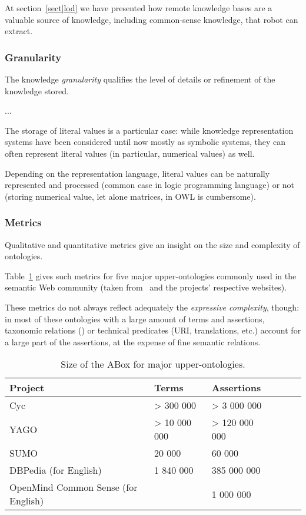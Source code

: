 At section~\ref{sect|lod} we have presented how remote knowledge bases are a
valuable source of knowledge, including common-sense knowledge, that robot can
extract.

\subsubsection{Granularity}

The knowledge \emph{granularity} qualifies the level of details or refinement
of the knowledge stored.

...

The storage of literal values is a particular case: while knowledge
representation systems have been considered until now mostly as symbolic
systems, they can often represent literal values (in particular, numerical
values) as well.

Depending on the representation language, literal values can be naturally
represented and processed (common case in logic programming language) or not
(storing numerical value, let alone matrices, in OWL is cumbersome).

\subsubsection{Metrics}

Qualitative and quantitative metrics give an insight on the size and
complexity of ontologies.

Table~\ref{table|upper_onto_metrics} gives such metrics for five major
upper-ontologies commonly used in the semantic Web community (taken
from~\cite{Mascardi2007} and the projects' respective websites).

These metrics do not always reflect adequately the \emph{expressive
complexity}, though: in most of these ontologies with a large amount of terms
and assertions, taxonomic relations () or technical predicates
(URI, translations, etc.) account for a large part of the assertions, at the
expense of fine semantic relations.

\begin{table}
\begin{center}

\begin{tabular}{llllll}
\toprule
{\bf Project} & {\bf Terms} & {\bf Assertions} \\
\midrule
Cyc & > 300 000 & > 3 000 000 & \\
YAGO & > 10 000 000 & > 120 000 000 \\
SUMO & 20 000 & 60 000 \\
DBPedia (for English) & 1 840 000 & 385 000 000\\
OpenMind Common Sense (for English) & & 1 000 000\\
\bottomrule

\end{tabular}
\end{center}
\caption{Size of the ABox for major upper-ontologies.}
\label{table|upper_onto_metrics}
\end{table}


